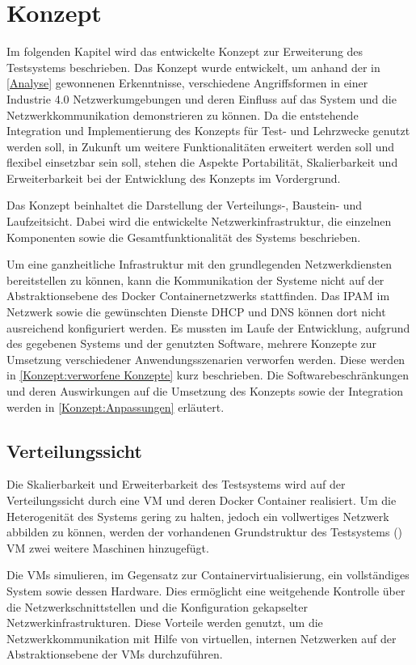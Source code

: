 \chapter{Konzept}
\label{Konzept}
Im folgenden Kapitel wird das entwickelte Konzept zur Erweiterung des Testsystems beschrieben. Das Konzept wurde entwickelt, um anhand der in \autoref{Analyse} gewonnenen Erkenntnisse, verschiedene Angriffsformen in einer Industrie 4.0 Netzwerkumgebungen und deren Einfluss auf das System und die Netzwerkkommunikation demonstrieren zu können. Da die entstehende Integration und Implementierung des Konzepts für Test- und Lehrzwecke genutzt werden soll, in Zukunft um weitere Funktionalitäten erweitert werden soll und flexibel einsetzbar sein soll, stehen die Aspekte Portabilität, Skalierbarkeit und Erweiterbarkeit bei der Entwicklung des Konzepts im Vordergrund.

Das Konzept beinhaltet die Darstellung der Verteilungs-, Baustein- und Laufzeitsicht. Dabei wird die entwickelte Netzwerkinfrastruktur, die einzelnen Komponenten sowie die Gesamtfunktionalität des Systems beschrieben.

Um eine ganzheitliche Infrastruktur mit den grundlegenden Netzwerkdiensten bereitstellen zu können, kann die Kommunikation der Systeme nicht auf der Abstraktionsebene des Docker Containernetzwerks stattfinden. Das \ac{IPAM} im Netzwerk sowie die gewünschten Dienste \ac{DHCP} und \ac{DNS} können dort nicht ausreichend konfiguriert werden. Es mussten im Laufe der Entwicklung, aufgrund des gegebenen Systems und der genutzten Software, mehrere Konzepte zur Umsetzung verschiedener Anwendungsszenarien verworfen werden. Diese werden in \autoref{Konzept:verworfene Konzepte} kurz beschrieben. Die Softwarebeschränkungen und deren Auswirkungen auf die Umsetzung des Konzepts sowie der Integration werden in \autoref{Konzept:Anpassungen} erläutert.

\section{Verteilungssicht}
Die Skalierbarkeit und Erweiterbarkeit des Testsystems wird auf der Verteilungssicht durch eine \ac{VM} und deren Docker Container realisiert. Um die Heterogenität des Systems gering zu halten, jedoch ein vollwertiges Netzwerk abbilden zu können, werden der vorhandenen Grundstruktur des Testsystems (\cite{Weber2018}) \ac{VM} zwei weitere Maschinen hinzugefügt.

Die \ac{VM}s simulieren, im Gegensatz zur Containervirtualisierung, ein vollständiges System sowie dessen Hardware. Dies ermöglicht eine weitgehende Kontrolle über die Netzwerkschnittstellen und die Konfiguration gekapselter Netzwerkinfrastrukturen. Diese Vorteile werden genutzt, um die Netzwerkkommunikation mit Hilfe von virtuellen, internen Netzwerken auf der Abstraktionsebene der \ac{VM}s durchzuführen.

